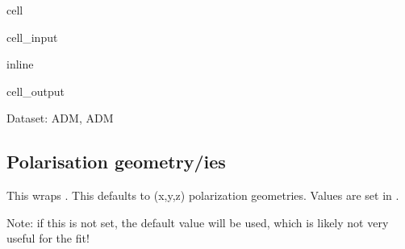 \documentclass[letterpaper,table,10pt,english]{jupyterBook}
\begin{document}
\begin{sphinxuseclass}{cell}\begin{sphinxVerbatimInput}

\begin{sphinxuseclass}{cell_input}
\begin{sphinxVerbatim}[commandchars=\\\{\}]
 inline
  
\end{sphinxVerbatim}

\end{sphinxuseclass}\end{sphinxVerbatimInput}
\begin{sphinxVerbatimOutput}

\begin{sphinxuseclass}{cell_output}
\begin{sphinxVerbatim}[commandchars=\\\{\}]
Dataset: ADM, ADM
\end{sphinxVerbatim}

\noindent{}

\end{sphinxuseclass}\end{sphinxVerbatimOutput}

\end{sphinxuseclass}

\subsection{Polarisation geometry/ies}
\label{\detokenize{part2/basic_fitting_numerics_intro_260723:polarisation-geometry-ies}}
\sphinxAtStartPar
This wraps . This defaults to (x,y,z) polarization geometries. Values are set in .

\sphinxAtStartPar
Note: if this is not set, the default value will be used, which is likely not very useful for the fit!
\end{document}
